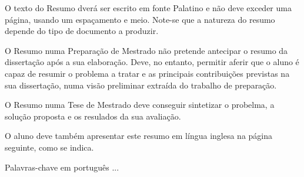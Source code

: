 \resumo 
O texto do Resumo dverá ser escrito em fonte Palatino e não deve exceder uma página, usando um espaçamento e meio.  Note-se que a natureza do resumo depende do tipo de documento a produzir. 

O Resumo numa Preparação de Mestrado não pretende antecipar o resumo da dissertação após a sua elaboração. Deve, no entanto, permitir aferir que o aluno é capaz de resumir o problema a tratar e as principais contribuições previstas na sua dissertação, numa visão preliminar extraída do trabalho de preparação. 

O Resumo numa Tese de Mestrado deve conseguir sintetizar o probelma, a solução proposta e os resulados da sua avaliação.

O aluno deve também apresentar este resumo em língua inglesa na página seguinte, como se indica. 

\begin{keywords}
Palavras-chave em português ...
\end{keywords}
